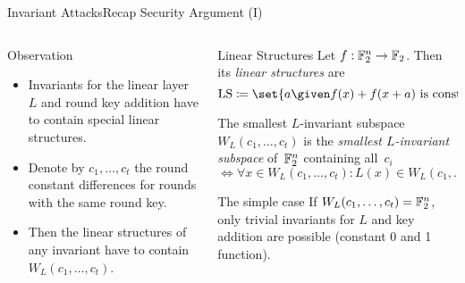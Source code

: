 \begin{frame}{Invariant Attacks}{Recap Security Argument (I)}
    \begin{columns}
        \begin{column}{0.35\textwidth}
        \begin{block}{Observation}
            \begin{itemize}
                \item Invariants for the linear layer $L$ and round key addition have to contain special linear structures.
                \item Denote by $c_1, \dots, c_t$ the round constant differences for rounds with the same round key.
                \item Then the linear structures of any invariant have to contain $W_L(c_1, \dots, c_t)$.
            \end{itemize}
        \end{block}
        \pause
    \end{column}
    \begin{column}{0.6\textwidth}
    \begin{block}{Linear Structures}
        Let $f : \mathbb{F}_2^n \to \mathbb{F}_2$.
        Then its \emph{linear structures} are
        \vspace*{-5pt}
        \begin{equation*}
            \mathrm{LS} \coloneqq \set{a \given f(x) + f(x+a) \text{ is constant}}\;.
        \end{equation*}
        \vspace*{-15pt}
    \end{block}
    \begin{block}{The smallest $L$-invariant subspace}
        $W_L(c_1, \dots, c_t)$ is the \emph{smallest $L$-invariant subspace} of~$\mathbb{F}_2^n$ containing all~$c_i$
        \vspace*{-5pt}
        \begin{equation*}
            \Leftrightarrow \forall x \in W_L(c_1, \dots, c_t): L(x) \in W_L(c_1, \dots, c_t)
        \end{equation*}
        \vspace*{-15pt}
    \end{block}
    \pause
    \begin{exampleblock}{The simple case}
        If $W_L(c_1, \dots, c_t) = \mathbb{F}_2^n$, only trivial invariants for $L$ and key addition are possible (constant 0 and 1 function).
    \end{exampleblock}
    \end{column}
    \end{columns}
\end{frame}

